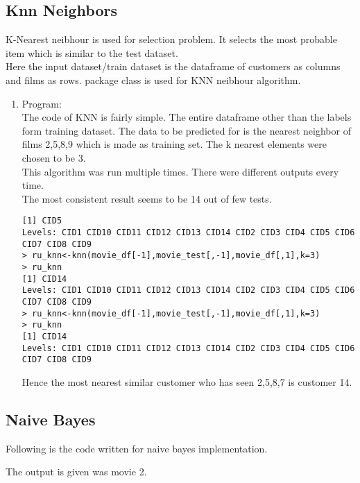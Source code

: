 \documentclass{article}
\begin{document}
\subsection{Knn Neighbors}
K-Nearest neibhour is used for selection problem. It selects the most probable item which is similar to the test dataset.\\
Here the input dataset/train dataset is the dataframe of customers as columns and films as rows. package class is used for KNN neibhour algorithm.
\begin{enumerate}
\item Program:\\
The code of KNN is fairly simple. The entire dataframe other than the labels form training dataset. The data to be predicted for is the nearest neighbor of films 2,5,8,9 which is made as training set. The k nearest elements were chosen to be 3.\\


This algorithm was run multiple times. There were different outputs every time.\\
The most consistent result seems to be 14 out of few tests.\\
\begin{verbatim}
[1] CID5
Levels: CID1 CID10 CID11 CID12 CID13 CID14 CID2 CID3 CID4 CID5 CID6 CID7 CID8 CID9
> ru_knn<-knn(movie_df[-1],movie_test[,-1],movie_df[,1],k=3)
> ru_knn
[1] CID14
Levels: CID1 CID10 CID11 CID12 CID13 CID14 CID2 CID3 CID4 CID5 CID6 CID7 CID8 CID9
> ru_knn<-knn(movie_df[-1],movie_test[,-1],movie_df[,1],k=3)
> ru_knn
[1] CID14
Levels: CID1 CID10 CID11 CID12 CID13 CID14 CID2 CID3 CID4 CID5 CID6 CID7 CID8 CID9
\end{verbatim}
Hence the most nearest similar customer who has seen 2,5,8,7 is customer 14.
\end{enumerate}
\subsection{Naive Bayes}
Following is the code written for naive bayes implementation.

The output is given was movie 2.
\end{document}
